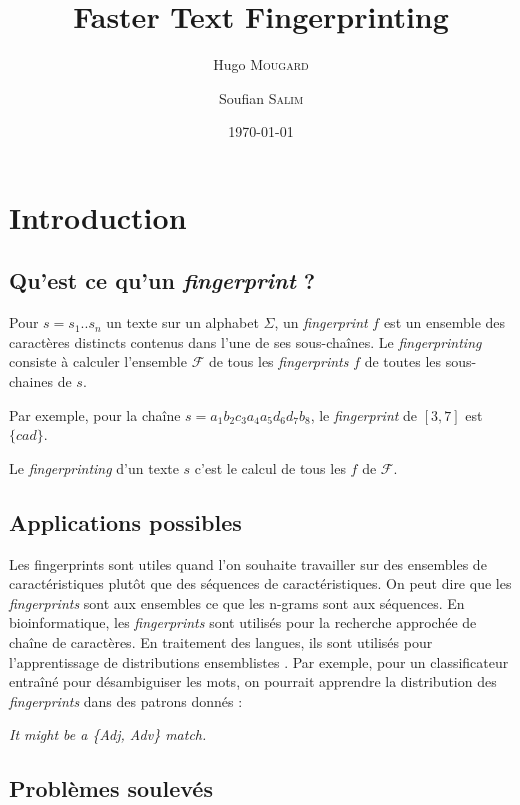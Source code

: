 \documentclass[a4paper]{article}
\title{Faster Text Fingerprinting}
\author{Hugo \textsc{Mougard} \and Soufian \textsc{Salim}}
\date{\today}
\begin{document}
\maketitle

\section{Introduction}

\subsection{Qu'est ce qu'un \emph{fingerprint} ?}

Pour $s = s_{1} .. s_{n}$ un texte sur un alphabet $\Sigma$, un \textit{fingerprint} $f$ est un ensemble des caractères distincts contenus dans l'une de ses sous-chaînes. Le \emph{fingerprinting} consiste à calculer l'ensemble $\mathcal{F}$ de tous les \emph{fingerprints} $f$ de toutes les sous-chaines de $s$.  \newline

Par exemple, pour la chaîne $s = a_{1} b_{2} c_{3} a_{4} a_{5} d_{6} d_{7} b_{8}$, le \emph{fingerprint} de $[3,7]$ est $\{cad\}$. \newline

Le \emph{fingerprinting} d'un texte $s$ c'est le calcul de tous les $f$ de $\mathcal{F}$.

\subsection{Applications possibles}

Les fingerprints sont utiles quand l'on souhaite travailler sur des ensembles de caractéristiques plutôt que des séquences de caractéristiques. On peut dire que les \emph{fingerprints} sont aux ensembles ce que les n-grams sont aux séquences. En bioinformatique, les \emph{fingerprints} sont utilisés pour la recherche approchée de chaîne de caractères. En traitement des langues, ils sont utilisés pour l'apprentissage de distributions ensemblistes \cite{amir}. Par exemple, pour un classificateur entraîné pour désambiguiser les mots, on pourrait apprendre la distribution des \emph{fingerprints} dans des patrons donnés : \newline

\emph{It might be a \{Adj, Adv\} match.}

\subsection{Problèmes soulevés}
\end{document}
